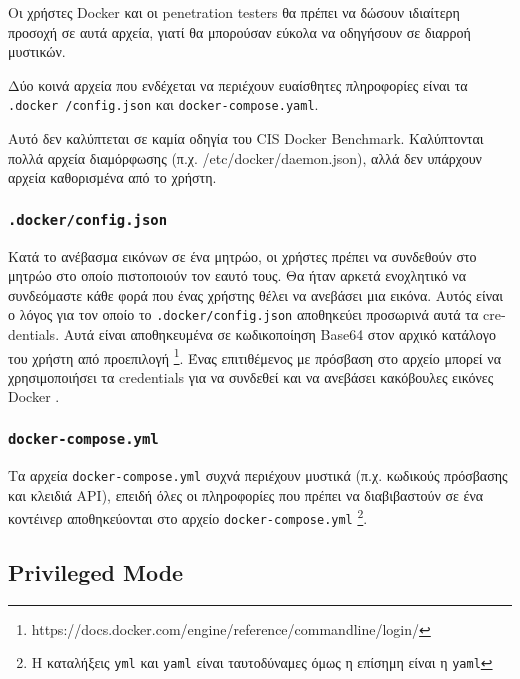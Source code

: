 Οι χρήστες \textlatin{Docker} και οι \textlatin{penetration testers} θα πρέπει
να δώσουν ιδιαίτερη προσοχή σε αυτά αρχεία, γιατί θα μπορούσαν εύκολα να
οδηγήσουν σε διαρροή μυστικών.

Δύο κοινά αρχεία που ενδέχεται να περιέχουν ευαίσθητες πληροφορίες είναι τα 
\texttt{\textlatin{.docker
/config.json}} και \texttt{\textlatin{docker-compose.yaml}}.

Αυτό δεν καλύπτεται σε καμία οδηγία του \textlatin{CIS Docker Benchmark}. Καλύπτονται πολλά αρχεία διαμόρφωσης (π.χ. /etc/docker/daemon.json), αλλά
δεν υπάρχουν αρχεία καθορισμένα από το χρήστη.

\subsubsection{\texttt{\textlatin{.docker/config.json}}}

Κατά το ανέβασμα εικόνων σε ένα μητρώο, οι χρήστες πρέπει να συνδεθούν στο
μητρώο στο οποίο πιστοποιούν τον εαυτό τους. Θα ήταν αρκετά ενοχλητικό να
συνδεόμαστε κάθε φορά που ένας χρήστης θέλει να ανεβάσει μια εικόνα. Αυτός
είναι ο λόγος για τον οποίο το \texttt{\textlatin{.docker/config.json}}
αποθηκεύει προσωρινά αυτά τα \textlatin{credentials}. Αυτά είναι αποθηκευμένα
σε κωδικοποίηση \textlatin{Base64} στον αρχικό κατάλογο του χρήστη από
προεπιλογή
\footnote{\textlatin{https://docs.docker.com/engine/reference/commandline/login/}}.
Ένας επιτιθέμενος με πρόσβαση στο αρχείο μπορεί να χρησιμοποιήσει τα
\textlatin{credentials} για να συνδεθεί και να ανεβάσει κακόβουλες εικόνες
\textlatin{Docker} \cite{Docker-Credentials-Metasploit}.

\subsubsection{\texttt{\textlatin{docker-compose.yml}}}

Τα αρχεία \texttt{\textlatin{docker-compose.yml}} συχνά περιέχουν μυστικά (π.χ.
κωδικούς πρόσβασης και κλειδιά \textlatin{API}), επειδή όλες οι πληροφορίες που
πρέπει να διαβιβαστούν σε ένα κοντέινερ αποθηκεύονται στο
αρχείο \texttt{\textlatin{docker-compose.yml}} \footnote{Η καταλήξεις
\texttt{\textlatin{yml}} και \texttt{\textlatin{yaml}} είναι ταυτοδύναμες όμως
η επίσημη είναι η \texttt{\textlatin{yaml}}}.

\subsection{\textlatin{Privileged Mode}}

